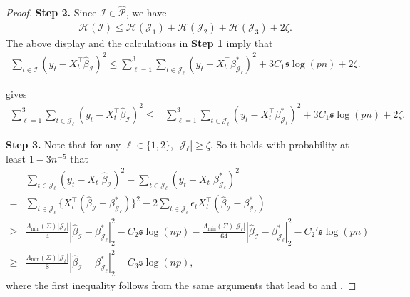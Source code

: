 \documentclass[11pt]{article}
\newcommand{\I}{{\mathcal I }}
\newcommand{\J}{{  \mathcal J } }
\newcommand{\s}{ { \mathfrak{s}  } }
\theoremstyle{plain}
\theoremstyle{definition}
\begin{document}
\begin{proof}
 {\bf Step 2.} Since $\I \in \widehat{\mathcal P} $, we have
 \begin{align}\label{eq:regression two change points local min} \mathcal H (\I ) \le \mathcal H (\J_1  ) +\mathcal H (\J_2 )+\mathcal H (\J_3 ) + 2 \zeta. 
 \end{align} The above display and the calculations in  {\bf Step 1}   imply that
\begin{align} 
 \sum_{ t  \in \I }(y_t  -  X_t ^\top \widehat \beta _\I ) ^2  
\le   \sum_{\ell=1}^3 \sum_{t  \in \J_ \ell  }(y_t  -  X_t ^\top    \beta^*  _{\J_\ell }  ) ^2   +3C_1 \s\log(pn)   +2 \zeta .
  \label{eq:regression two change points step 2 term 1}
\end{align}

  gives 
\begin{align} 
 \sum_{\ell=1}^3 \sum_{t  \in \J_{\ell}  }(y_t  - X_t ^\top  \widehat \beta _\I ) ^2 
 \le& \sum_{\ell=1}^3 \sum_{t  \in \J_ \ell  }(y_t  -  X_t ^\top    \beta^*  _{\J_\ell }  ) ^2    
   +3C_1 \s\log(pn)   +2\zeta       \label{eq:regression two change points first}.
\end{align}

{\bf Step 3.} Note that  for any $\ell\in \{1,2\}$, $ |\J_\ell| \ge \zeta   $.  So it holds with probability at least $1 -3n^{-5}$ that
\begin{align}  \nonumber 
 &  \sum_{t  \in \J_{\ell }  }(y_t  - X_t ^\top  \widehat \beta _\I ) ^2 
 -   \sum_{t  \in \J_ \ell  }(y_t  -  X_t ^\top    \beta^*  _{\J_\ell   }  ) ^2   
 \\
 =&  \nonumber   \sum_{t  \in \J_{\ell  }  }  \{ X_t^\top (\widehat \beta _\I  -  \beta^*  _{\J_\ell  }  ) \} ^2 - 2  \sum_{t  \in \J_{\ell }  } \epsilon_t X_t^\top (\widehat \beta _\I  -  \beta^*  _{\J_\ell  }  ) 
 \\
 \ge&  \nonumber   \frac{\Lambda_{\min} (\Sigma) |\J_\ell  | }{4}  |\widehat \beta _\I  -  \beta^* _{\J_ \ell  }  |_2^2  -   C_2 \s  \log(np)       - \frac{ \Lambda_{\min}(\Sigma)  | \J_ \ell |}{64}  |  \widehat \beta _\I  -  \beta _{\J_\ell  }^*    |_2  ^2  - C_2'    \s \log(pn)
 \\ \label{eq:regression two change points step 3 term 1}
 \ge &  \frac{\Lambda_{\min} (\Sigma) |\J_\ell  | }{8}  |\widehat \beta _\I  -  \beta^* _{\J_ \ell  }  |_2^2  -   C_3 \s  \log(np)       ,
\end{align}
where the first inequality follows from the same arguments that lead to 
    and  .


\end{proof}
\end{document}
